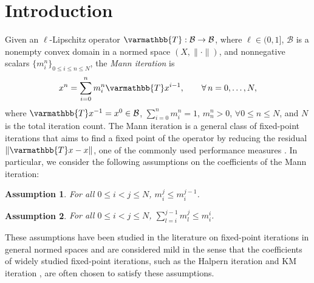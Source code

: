 \documentclass[pdflatex,sn-mathphys-num]{sn-jnl}%
\newcommand{\cB}{\mathcal{B}}
\newcommand{\opT}{{\varmathbb{T}}}
\theoremstyle{thmstyleone}%
\theoremstyle{thmstyletwo}%
\newtheorem{assum}{Assumption}
\theoremstyle{thmstylethree}%
\begin{document}



\maketitle
\section{Introduction}\label{sec1}
Given an $\ell$-Lipschitz operator $\varmathbb{T}: \cB \rightarrow \cB$, where $\ell \in (0,1]$, $\cB$ is a nonempty convex domain in a normed space $(X, \|\cdot\|)$, and nonnegative scalars
$\{m^n_i\}_{0 \le i \le n \le N}$, the \emph{Mann iteration} \cite{Mann1953mean} is
\[
x^{n} = \sum^{n}_{i=0} m^n_i \opT x^{i-1},
\qquad \forall\, n=0,\dots,N,
\]
where $\opT x^{-1}=x^0 \in \cB$,  $\sum^n_{i=0}m^n_i=1$, $m^n_n>0$, $\forall 0\le n \le N$, and $N$ is the total iteration count. The Mann iteration is a general class of fixed-point iterations that aims to find a fixed point of the operator by reducing the residual $\|\opT x-x\|$, one of the commonly used performance measures \cite{leustean2007rates, matsushita2017convergence, cominetti2014rate, lee2024accelerating, lee2025multi,d2025, cc2023, bravo2026minimax, bravo2026krasnosel, krasnosel1955two, baillon1992optimal, bc2018}. In particular, we consider the following assumptions on the coefficients of the Mann iteration:
\begin{assum}\label{assum:montone}
For all $0\le i<j\le N$, $m^{j}_i \le m^{j-1}_i$.
\end{assum}
\begin{assum}\label{assum:sim}
For all $0 \le i < j\le N$, $\sum^{j-1}_{l=i}m^j_l \le m^i_i$.
\end{assum}
\noindent These assumptions have been studied in the literature on fixed-point iterations in general normed spaces \cite{bc2018, bravo2021universal, cc2023, bravo2026minimax, bravo2026krasnosel} and are considered mild in the sense that the coefficients of widely studied fixed-point iterations, such as the Halpern iteration \cite{lieder2021convergence, ss2017, pr2022, bravo2026minimax} and KM iteration \cite{krasnosel1955two, baillon1992optimal, bc2018}, are often chosen to satisfy these assumptions.
\end{document}
